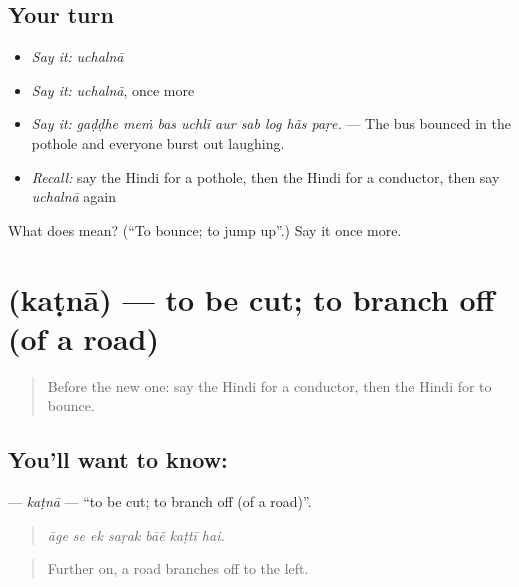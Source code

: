 \subsection*{Your turn}
\begin{itemize}
\raggedright
  \item \emph{Say it:} \emph{uchalnā}
  \item \emph{Say it:} \emph{uchalnā}, once more
  \item \emph{Say it:} \emph{gaḍḍhe meṁ bas uchlī aur sab log hãs paṛe.} — The bus bounced in the pothole and everyone burst out laughing.
  \item \emph{Recall:} say the Hindi for a pothole, then the Hindi for a conductor, then say \emph{uchalnā} again
\end{itemize}

\begin{tcolorbox}[breakable,colback=teal!4,colframe=teal!35!black,title={Before you move on}]
What does  mean? (\textquotedblleft{}To bounce; to jump up\textquotedblright{}.) Say it once more.
\end{tcolorbox}
\section[\texorpdfstring{\hi{कटना} (kaṭnā)}{कटना (kaṭnā)}]{ (kaṭnā) — to be cut; to branch off (of a road)}

\label{lesson:HI-C405-kattna}



\begin{quote}
Before the new one: say the Hindi for a conductor, then the Hindi for to bounce.
\end{quote}

\subsection*{You'll want to know: }
\textbf{} — \emph{kaṭnā} — \textquotedblleft{}to be cut; to branch off (of a road)\textquotedblright{}.

\begin{quote}
      
\end{quote}

\begin{quote}
\emph{āge se ek saṛak bāẽ kaṭtī hai.}
\end{quote}

\begin{quote}
Further on, a road branches off to the left.
\end{quote}

